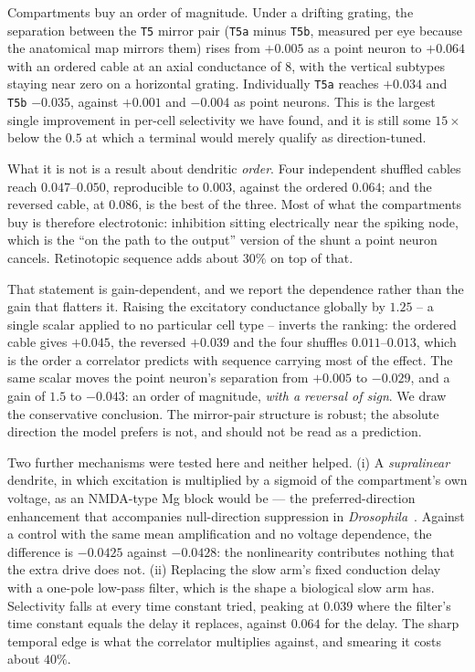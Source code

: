 \documentclass[10pt,twoside]{article}
\newcommand{\cell}[1]{\texttt{#1}}
\begin{document}
Compartments buy an order of magnitude. Under a drifting grating, the
separation between the \cell{T5} mirror pair (\cell{T5a} minus \cell{T5b},
measured per eye because the anatomical map mirrors them) rises from
$+0.005$ as a point neuron to $+0.064$ with an ordered cable at an axial
conductance of 8, with the vertical subtypes staying near zero on a horizontal
grating. Individually \cell{T5a} reaches $+0.034$ and \cell{T5b} $-0.035$,
against $+0.001$ and $-0.004$ as point neurons. This is the largest single
improvement in per-cell selectivity we have found, and it is still some
$15\times$ below the $0.5$ at which a terminal would merely qualify as
direction-tuned.

What it is not is a result about dendritic \emph{order}. Four independent
shuffled cables reach $0.047$--$0.050$, reproducible to $0.003$, against the
ordered $0.064$; and the reversed cable, at $0.086$, is the best of the three.
Most of what the compartments buy is therefore electrotonic: inhibition sitting
electrically near the spiking node, which is the ``on the path to the output''
version of the shunt a point neuron cancels. Retinotopic sequence adds about
$30\%$ on top of that.

That statement is gain-dependent, and we report the dependence rather than the
gain that flatters it. Raising the excitatory conductance globally by $1.25$ --
a single scalar applied to no particular cell type -- inverts the ranking: the
ordered cable gives $+0.045$, the reversed $+0.039$ and the four shuffles
$0.011$--$0.013$, which is the order a correlator predicts with sequence
carrying most of the effect. The same scalar moves the point neuron's
separation from $+0.005$ to $-0.029$, and a gain of $1.5$ to $-0.043$: an order
of magnitude, \emph{with a reversal of sign}. We draw the conservative
conclusion. The mirror-pair structure is robust; the absolute direction the
model prefers is not, and should not be read as a prediction.

Two further mechanisms were tested here and neither helped. (i) A
\emph{supralinear} dendrite, in which excitation is multiplied by a sigmoid of
the compartment's own voltage, as an NMDA-type Mg block would be --- the
preferred-direction enhancement that accompanies null-direction suppression in
\emph{Drosophila}~\citep{haag2016,gruntman2018}. Against a control with the
same mean amplification and no voltage dependence, the difference is
$-0.0425$ against $-0.0428$: the nonlinearity contributes nothing that the
extra drive does not. (ii) Replacing the slow arm's fixed conduction delay with
a one-pole low-pass filter, which is the shape a biological slow arm has.
Selectivity falls at every time constant tried, peaking at $0.039$ where the
filter's time constant equals the delay it replaces, against $0.064$ for the
delay. The sharp temporal edge is what the correlator multiplies against, and
smearing it costs about $40\%$.
\end{document}
